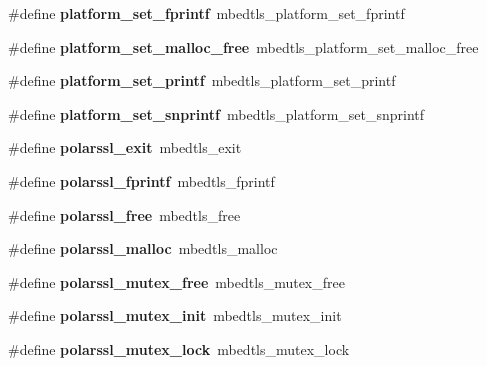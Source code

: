 \begin{DoxyCompactItemize}
\#define {\bfseries platform\+\_\+set\+\_\+fprintf}~mbedtls\+\_\+platform\+\_\+set\+\_\+fprintf
\item 
\mbox{\label{compat-1_83_8h_a0316cccad168d561754429525cad2a61}} 
\#define {\bfseries platform\+\_\+set\+\_\+malloc\+\_\+free}~mbedtls\+\_\+platform\+\_\+set\+\_\+malloc\+\_\+free
\item 
\mbox{\label{compat-1_83_8h_a741d3700074db753e92b26cee56c603e}} 
\#define {\bfseries platform\+\_\+set\+\_\+printf}~mbedtls\+\_\+platform\+\_\+set\+\_\+printf
\item 
\mbox{\label{compat-1_83_8h_a8da1060a8ce014082df67d529d799a77}} 
\#define {\bfseries platform\+\_\+set\+\_\+snprintf}~mbedtls\+\_\+platform\+\_\+set\+\_\+snprintf
\item 
\mbox{\label{compat-1_83_8h_a66a39dbfa7ce1de12846d781ac41b146}} 
\#define {\bfseries polarssl\+\_\+exit}~mbedtls\+\_\+exit
\item 
\mbox{\label{compat-1_83_8h_a1cf50644470132d69e084ce34f4182fe}} 
\#define {\bfseries polarssl\+\_\+fprintf}~mbedtls\+\_\+fprintf
\item 
\mbox{\label{compat-1_83_8h_a3c8219c194813f302bf78fe73566cb2d}} 
\#define {\bfseries polarssl\+\_\+free}~mbedtls\+\_\+free
\item 
\mbox{\label{compat-1_83_8h_a2a0cfb9e59f28e2a1a5fd1880fb20d4b}} 
\#define {\bfseries polarssl\+\_\+malloc}~mbedtls\+\_\+malloc
\item 
\mbox{\label{compat-1_83_8h_a499220b866b06decc2665f2192f453fb}} 
\#define {\bfseries polarssl\+\_\+mutex\+\_\+free}~mbedtls\+\_\+mutex\+\_\+free
\item 
\mbox{\label{compat-1_83_8h_a7bede0c29df31f17c1e93ec10f2c334e}} 
\#define {\bfseries polarssl\+\_\+mutex\+\_\+init}~mbedtls\+\_\+mutex\+\_\+init
\item 
\mbox{\label{compat-1_83_8h_a112d459d01def062aec588fe0483aa0d}} 
\#define {\bfseries polarssl\+\_\+mutex\+\_\+lock}~mbedtls\+\_\+mutex\+\_\+lock

\end{DoxyCompactItemize}
